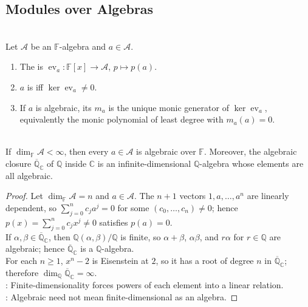 \subsection{Modules over Algebras}

\begin{definition} \label{def:algebraic-element-minimal-polynomial-algebra} \\
Let $\mathcal{A}$ be an $\mathbb{F}$-algebra and $a\in\mathcal{A}$.
\begin{enumerate}[label=(\roman*)]
\setlength{\itemsep}{0pt}
\item The  is $\operatorname{ev}_a:\mathbb{F}[x]\to\mathcal{A}$, $p\mapsto p(a)$.
\item $a$ is  iff $\ker\operatorname{ev}_a\neq0$.
\item If $a$ is algebraic, its  $m_a$ is the unique monic generator of $\ker\operatorname{ev}_a$, equivalently the monic polynomial of least degree with $m_a(a)=0$.
\end{enumerate}
\end{definition}

\begin{theorem} \label{thm:finite-dimensional-algebras-algebraic-elements} \\
If $\dim_{\mathbb{F}}\mathcal{A}<\infty$, then every $a\in\mathcal{A}$ is algebraic over $\mathbb{F}$. Moreover, the algebraic closure $\overline{\mathbb{Q}}_{\mathbb{C}}$ of $\mathbb{Q}$ inside $\mathbb{C}$ is an infinite-dimensional $\mathbb{Q}$-algebra whose elements are all algebraic.
\begin{proof}
Let $\dim_{\mathbb{F}}\mathcal{A}=n$ and $a\in\mathcal{A}$. The $n+1$ vectors $1,a,\ldots,a^n$ are linearly dependent, so $\sum_{j=0}^{n}c_ja^j=0$ for some $(c_0,\ldots,c_n)\neq0$; hence $p(x)=\sum_{j=0}^{n}c_jx^j\neq0$ satisfies $p(a)=0$.\\
If $\alpha,\beta\in\overline{\mathbb{Q}}_{\mathbb{C}}$, then $\mathbb{Q}(\alpha,\beta)/\mathbb{Q}$ is finite, so $\alpha+\beta$, $\alpha\beta$, and $r\alpha$ for $r\in\mathbb{Q}$ are algebraic; hence $\overline{\mathbb{Q}}_{\mathbb{C}}$ is a $\mathbb{Q}$-algebra.\\
For each $n\geq1$, $x^n-2$ is Eisenstein at $2$, so it has a root of degree $n$ in $\overline{\mathbb{Q}}_{\mathbb{C}}$; therefore $\dim_{\mathbb{Q}}\overline{\mathbb{Q}}_{\mathbb{C}}=\infty$.\\
: Finite-dimensionality forces powers of each element into a linear relation.\\
: Algebraic need not mean finite-dimensional as an algebra.
\end{proof}
\end{theorem}

